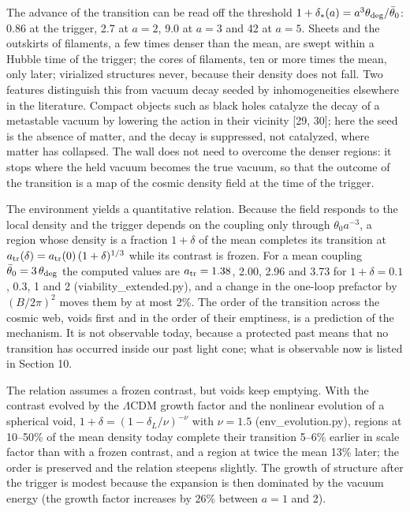 \documentclass[preprint,12pt]{elsarticle}
\begin{document}
The advance of the transition can be read off the threshold $1+\delta_*(a)=a^3\theta_{\rm deg}/\bar\theta_0$: 0.86 at the trigger, 2.7 at $a=2$, 9.0 at $a=3$ and 42 at $a=5$. Sheets and the outskirts of filaments, a few times denser than the mean, are swept within a Hubble time of the trigger; the cores of filaments, ten or more times the mean, only later; virialized structures never, because their density does not fall. Two features distinguish this from vacuum decay seeded by inhomogeneities elsewhere in the literature. Compact objects such as black holes catalyze the decay of a metastable vacuum by lowering the action in their vicinity [29, 30]; here the seed is the absence of matter, and the decay is suppressed, not catalyzed, where matter has collapsed. The wall does not need to overcome the denser regions: it stops where the held vacuum becomes the true vacuum, so that the outcome of the transition is a map of the cosmic density field at the time of the trigger.

The environment yields a quantitative relation. Because the field responds to the local density and the trigger depends on the coupling only through $\theta_0a^{-3}$, a region whose density is a fraction $1+\delta$ of the mean completes its transition at $a_{\rm tr}(\delta)=a_{\rm tr}(0)\,(1+\delta)^{1/3}$ while its contrast is frozen. For a mean coupling $\bar\theta_0=3\,\theta_{\rm deg}$ the computed values are $a_{\rm tr}=1.38$, 2.00, 2.96 and 3.73 for $1+\delta=0.1$, 0.3, 1 and 2 (viability\_extended.py), and a change in the one-loop prefactor by $(B/2\pi)^2$ moves them by at most 2\%. The order of the transition across the cosmic web, voids first and in the order of their emptiness, is a prediction of the mechanism. It is not observable today, because a protected past means that no transition has occurred inside our past light cone; what is observable now is listed in Section 10.

The relation assumes a frozen contrast, but voids keep emptying. With the contrast evolved by the $\Lambda$CDM growth factor and the nonlinear evolution of a spherical void, $1+\delta=(1-\delta_L/\nu)^{-\nu}$ with $\nu=1.5$ (env\_evolution.py), regions at 10--50\% of the mean density today complete their transition 5--6\% earlier in scale factor than with a frozen contrast, and a region at twice the mean 13\% later; the order is preserved and the relation steepens slightly. The growth of structure after the trigger is modest because the expansion is then dominated by the vacuum energy (the growth factor increases by 26\% between $a=1$ and 2).
\end{document}

